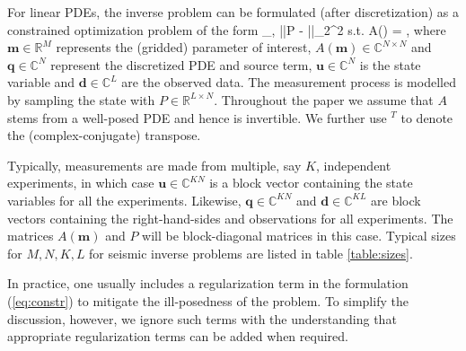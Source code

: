 \documentclass{iopart}
\begin{document}
For linear PDEs, the inverse problem can be formulated (after discretization) as a constrained optimization problem of the form
\bq
\label{eq:constr}
\min_{,} ||P - ||_2^2  \quad 
\mbox{s.t.} \quad A() = ,
\eq
where $\mathbf{m}\in\mathbb{R}^{M}$ represents the (gridded) parameter of interest, $A(\mathbf{m})\in\mathbb{C}^{N\times N}$ and $\mathbf{q}\in\mathbb{C}^{N}$ represent the discretized PDE and source term, $\mathbf{u}\in\mathbb{C}^{N}$ is the state variable and $\mathbf{d}\in \mathbb{C}^{L}$ are the observed data. The measurement process is modelled by sampling the state with $P\in \mathbb{R}^{L\times N}$. Throughout the paper we assume that $A$ stems from a well-posed PDE and hence is invertible. We further use $^T$ to denote the (complex-conjugate) transpose.  

Typically, measurements are made from multiple, say $K$, independent experiments,
in which case $\mathbf{u} \in \mathbb{C}^{KN}$ is a block vector containing the state variables for all the experiments. Likewise, $\mathbf{q}\in \mathbb{C}^{KN}$ and $\mathbf{d}\in \mathbb{C}^{KL}$ are block vectors containing the right-hand-sides and observations for all experiments. The matrices $A(\mathbf{m})$ and $P$ will be block-diagonal matrices in this case. Typical sizes for $M,N,K,L$ for seismic inverse problems are listed in table \ref{table:sizes}.

In practice, one usually includes a regularization term in the formulation (\ref{eq:constr}) to mitigate the ill-posedness of the problem. To simplify the discussion, however, we ignore such terms with the understanding that appropriate regularization terms can be added when required.
\end{document}
